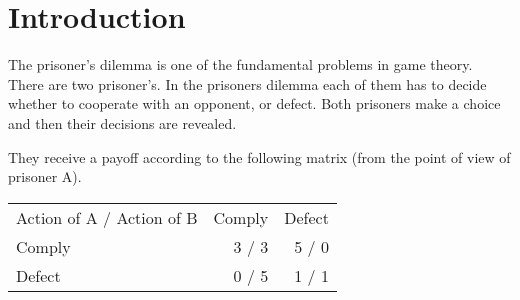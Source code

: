 \documentclass[a4paper,12pt]{article}
\begin{document}
\maketitle

\newcommand{\fittable}[1]{\begin{center}
\resizebox{\textwidth}{!}{#1}\end{center}
}

\newcommand{\img}[4]{
 \begin{figure}[!htp]
\centering
  \texttt{[image: \#2]}
  \caption{\emph{#3}}
  \label{#4}
 \end{figure}
}
\newcommand{\imgit}[4]{
\\[\intextsep]
\begin{minipage}{\linewidth}
  \centering%
  \texttt{[image: \#2]}%
  \figcaption{\emph{#3}}%
  \label{#4}%
\end{minipage}
\\[\intextsep]
}

\newcommand{\imgitX}[2]{
  {\centering
\fbox{
\begin{minipage}{#1\textwidth}
  \vskip .5em
  \centering
  \texttt{[image: \#2]}
  \vskip .5em
\end{minipage}
}
  }
}


\newpage

\tableofcontents

\section{Introduction}

The prisoner's dilemma is one of the fundamental problems in game theory.\\
There are two prisoner's. In the prisoners dilemma each of them has to decide whether to cooperate with an opponent, or defect. Both prisoners make a choice and then their decisions are revealed. 

They receive a payoff according to the following matrix (from the point of view of prisoner A). 

\begin{table*}[h]
	\centering
		\begin{tabular}{| l | r | r |}
		\hline
			Action of A / Action of B & Comply & Defect \\
			Comply                    & 3 / 3 & 5 / 0\\
			Defect                    & 0 / 5 & 1 / 1\\
			\hline
		\end{tabular}  
\end{table*}
\end{document}
